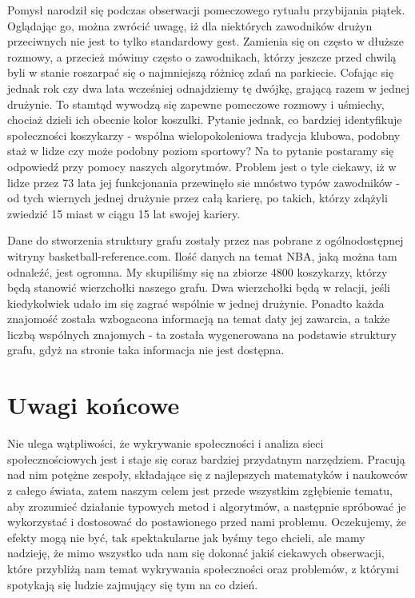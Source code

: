 \documentclass{article}
\begin{document}
Pomysł narodził się podczas obserwacji pomeczowego rytuału przybijania piątek. Oglądając go, można zwrócić uwagę, iż dla niektórych zawodników drużyn przeciwnych nie jest to tylko standardowy gest. Zamienia się on często w dłuższe rozmowy, a przecież mówimy często o zawodnikach, którzy jeszcze przed chwilą byli w stanie roszarpać się o najmniejszą różnicę zdań na parkiecie. Cofając się jednak rok czy dwa lata wcześniej odnajdziemy tę dwójkę, grającą razem w jednej drużynie. To stamtąd wywodzą się zapewne pomeczowe rozmowy i uśmiechy, chociaż dzieli ich obecnie kolor koszulki. Pytanie jednak, co bardziej identyfikuje społeczności koszykarzy - wspólna wielopokoleniowa tradycja klubowa, podobny staż w lidze czy może podobny poziom sportowy? Na to pytanie postaramy się odpowiedź przy pomocy naszych algorytmów. Problem jest o tyle ciekawy, iż w lidze przez 73 lata jej funkcjonania przewinęło sie mnóstwo typów zawodników - od tych wiernych jednej drużynie przez całą karierę, po takich, którzy zdążyli zwiedzić 15 miast w ciągu 15 lat swojej kariery.

Dane do stworzenia struktury grafu zostały przez nas pobrane z ogólnodostępnej witryny basketball-reference.com. Ilość danych na temat NBA, jaką można tam odnaleźć, jest ogromna. My skupiliśmy się na zbiorze 4800 koszykarzy, którzy będą stanowić wierzchołki naszego grafu. Dwa wierzchołki będą w relacji, jeśli kiedykolwiek udało im się zagrać wspólnie w jednej drużynie. Ponadto każda znajomość została wzbogacona informacją na temat daty jej zawarcia, a także liczbą wspólnych znajomych - ta została wygenerowana na podstawie struktury grafu, gdyż na stronie taka informacja nie jest dostępna.

\newpage
\section{Uwagi końcowe}


Nie ulega wątpliwości, że wykrywanie społeczności i analiza sieci społecznościowych jest i staje się coraz bardziej przydatnym narzędziem. Pracują nad nim potężne zespoły, składające się z najlepszych matematyków i naukowców z całego świata, zatem naszym celem jest przede wszystkim zgłębienie tematu, aby zrozumieć działanie typowych metod i algorytmów, a następnie spróbować je wykorzystać i dostosować do postawionego przed nami problemu. Oczekujemy, że efekty mogą nie być, tak spektakularne jak byśmy tego chcieli, ale mamy nadzieję, że mimo wszystko uda nam się dokonać jakiś ciekawych obserwacji, które przybliżą nam temat wykrywania społeczności oraz problemów, z którymi spotykają się ludzie zajmujący się tym na co dzień. 

\newpage
\printbibliography
\end{document}
